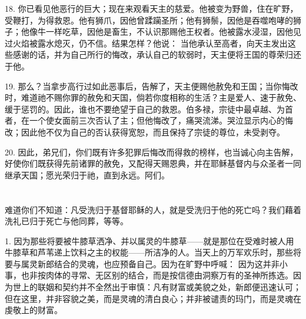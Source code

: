 18. 你已看见他恶行的巨大；现在来观看天主的慈爱。他被变为野兽，住在旷野，受鞭打，为得救恩。他有狮爪，因他曾蹂躏圣所；他有狮鬃，因他是吞噬咆哮的狮子；他像牛一样吃草，因他是畜生，不认识那赐他王权者。他被露水浸湿，因他见过火焰被露水熄灭，仍不信。结果怎样？他说： 当他承认至高者，向天主发出这些感谢的话，并为自己所行的悔改，承认自己的软弱时，天主便将王国的尊荣归还于他。\par

19. 那么？当拿步高行过如此恶事后，告解了，天主便赐他赦免和王国；当你悔改时，难道祂不赐你罪的赦免和天国，倘若你度相称的生活？主是爱人、速于赦免、缓于惩罚的。因此，谁也不要绝望于自己的救恩。伯多禄，宗徒中最卓越、为首者，在一个使女面前三次否认了主；但他悔改了，痛哭流涕。哭泣显示内心的悔改；因此他不仅为自己的否认获得宽恕，而且保持了宗徒的尊位，未受剥夺。\par

20. 因此，弟兄们，你们既有许多犯罪后悔改而得救的榜样，也当诚心向主告解，好使你们既获得先前诸罪的赦免，又配得天赐恩典，并在耶稣基督内与众圣者一同继承天国；愿光荣归于祂，直到永远。阿们。\par



\section{}

\par

\par

难道你们不知道：凡受洗归于基督耶稣的人，就是受洗归于他的死亡吗？我们藉着洗礼已归于死亡与他同葬，等等。\par

1. 因为那些将要被牛膝草洒净、并以属灵的牛膝草——就是那位在受难时被人用牛膝草和芦苇递上饮料之主的权能——所洁净的人。当天上的万军欢乐时，那些将要与属灵新郎结合的灵魂，也应预备自己。因为在旷野中呼喊： 因为这并非小事，也非按肉体的寻常、无区别的结合，而是按信德由洞察万有的圣神所拣选。因为世上的联姻和契约并不全然出于审慎：凡有财富或美貌之处，新郎便迅速认可；但在这里，并非容貌之美，而是灵魂的清白良心；并非被谴责的玛门，而是灵魂在虔敬上的财富。\par

